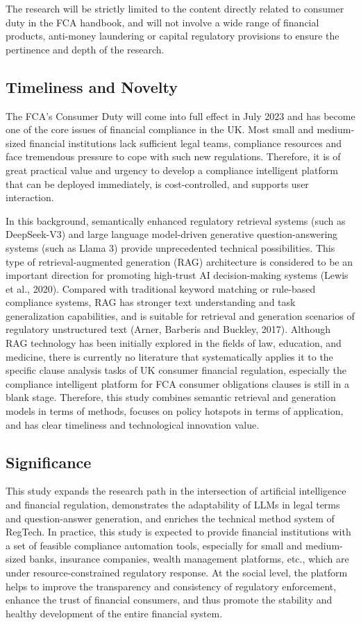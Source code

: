 \documentclass[a4paper,11pt]{article}
\begin{document}
The research will be strictly limited to the content directly related to consumer duty in the FCA handbook, and will not involve a wide range of financial products, anti-money laundering or capital regulatory provisions to ensure the pertinence and depth of the research.

\subsection{Timeliness and Novelty}

The FCA's Consumer Duty will come into full effect in July 2023 and has become one of the core issues of financial compliance in the UK. Most small and medium-sized financial institutions lack sufficient legal teams, compliance resources and face tremendous pressure to cope with such new regulations. Therefore, it is of great practical value and urgency to develop a compliance intelligent platform that can be deployed immediately, is cost-controlled, and supports user interaction.

In this background, semantically enhanced regulatory retrieval systems (such as DeepSeek-V3) and large language model-driven generative question-answering systems (such as Llama 3) provide unprecedented technical possibilities. This type of retrieval-augmented generation (RAG) architecture is considered to be an important direction for promoting high-trust AI decision-making systems (Lewis et al., 2020). Compared with traditional keyword matching or rule-based compliance systems, RAG has stronger text understanding and task generalization capabilities, and is suitable for retrieval and generation scenarios of regulatory unstructured text (Arner, Barberis and Buckley, 2017). Although RAG technology has been initially explored in the fields of law, education, and medicine, there is currently no literature that systematically applies it to the specific clause analysis tasks of UK consumer financial regulation, especially the compliance intelligent platform for FCA consumer obligations clauses is still in a blank stage. Therefore, this study combines semantic retrieval and generation models in terms of methods, focuses on policy hotspots in terms of application, and has clear timeliness and technological innovation value.

\subsection{Significance}

This study expands the research path in the intersection of artificial intelligence and financial regulation, demonstrates the adaptability of LLMs in legal terms and question-answer generation, and enriches the technical method system of RegTech. In practice, this study is expected to provide financial institutions with a set of feasible compliance automation tools, especially for small and medium-sized banks, insurance companies, wealth management platforms, etc., which are under resource-constrained regulatory response. At the social level, the platform helps to improve the transparency and consistency of regulatory enforcement, enhance the trust of financial consumers, and thus promote the stability and healthy development of the entire financial system.
\end{document}
